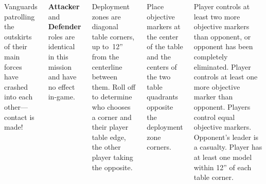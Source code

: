 
\begin{columns}

  Vanguards patrolling the outskirts of their main forces have crashed
  into each other---contact is made!

  \textbf{Attacker} and \textbf{Defender} roles are identical in this
  mission and have no effect in-game.

%


Deployment zones are diagonal table corners, up to~12'' from the
centerline between them.  Roll off to determine who chooses a corner
and their player table edge, the other player taking the opposite.

Place objective markers at the center of the table and the centers of
the two table quadrants opposite the deployment zone corners.

\columnbreak

\scoringbox
{Player controls at least
  two more objective markers than opponent, or opponent has been
  completely eliminated.}
{Player controls at least one more
                       objective marker than opponent.}
{Players control equal objective markers.}
{Opponent's leader is a casualty.}
{Player has at least one model within 12'' of each table corner.}

\end{columns}
